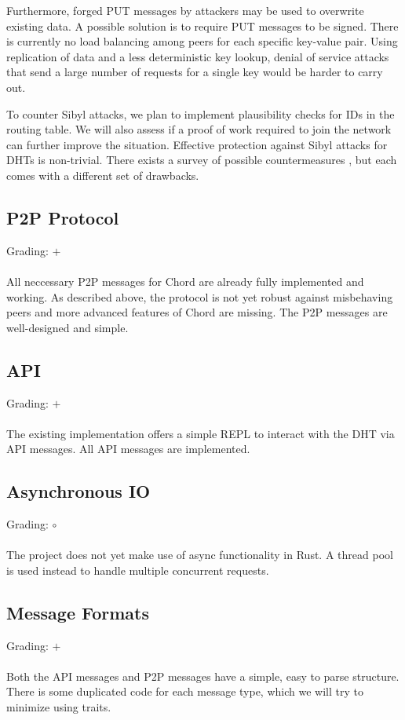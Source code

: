 \documentclass[a4paper, 11pt]{article}
\begin{document}
Furthermore, forged PUT messages by attackers may be used to overwrite existing data.
A possible solution is to require PUT messages to be signed.
There is currently no load balancing among peers for each specific key-value pair. 
Using replication of data and a less deterministic key lookup, denial of service attacks that send a large number of requests for a single key would be harder to carry out.

To counter Sibyl attacks, we plan to implement plausibility checks for IDs in the routing table.
We will also assess if a proof of work required to join the network can further improve the situation.
Effective protection against Sibyl attacks for DHTs is non-trivial.
There exists a survey of possible countermeasures \cite{urdaneta2011survey}, but each comes with a different set of drawbacks.


\subsection*{P2P Protocol}
Grading: $+$\\
\\
All neccessary P2P messages for Chord are already fully implemented and working.
As described above, the protocol is not yet robust against misbehaving peers and more advanced features of Chord are missing. 
The P2P messages are well-designed and simple.


\subsection*{API}
Grading: $+$\\
\\
The existing implementation offers a simple REPL to interact with the DHT via API messages.
All API messages are implemented.


\subsection*{Asynchronous IO}
Grading: $\circ$\\
\\
The project does not yet make use of async functionality in Rust.
A thread pool is used instead to handle multiple concurrent requests.


\subsection*{Message Formats}
Grading: $+$\\
\\
Both the API messages and P2P messages have a simple, easy to parse structure.
There is some duplicated code for each message type, which we will try to minimize using traits.
\end{document}
